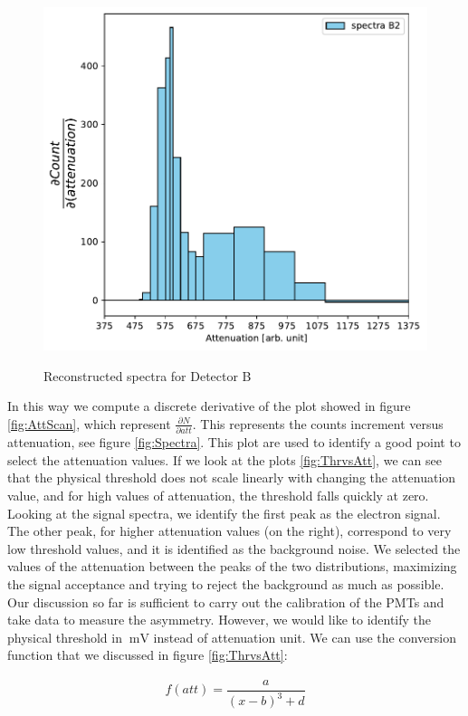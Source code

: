 \begin{figure}[!hbtp]
{\includegraphics[scale = 0.4]{Analysis/CalibrationPMT/B2.pdf}}
\caption{Reconstructed spectra for Detector B}
\end{figure}

In this way we compute a discrete derivative of the plot showed in figure \ref{fig:AttScan}, which represent $\frac{\partial N}{\partial att}$. This represents the counts increment versus attenuation, see figure \ref{fig:Spectra}.
This plot are used to identify a good point to select the attenuation values. If we look at the plots \ref{fig:ThrvsAtt}, we can see that the physical threshold does not scale linearly with changing the attenuation value, and for high values of attenuation, the threshold falls quickly at zero. 
Looking at the signal spectra, we identify the first peak as the electron signal. The other peak, for higher attenuation values (on the right), correspond to very low threshold values, and it is identified as the background noise. 
We selected the values of the attenuation between the peaks of the two distributions, maximizing the signal acceptance and trying to reject the background as much as possible.
Our discussion so far is sufficient to carry out the calibration of the PMTs and take data to measure the asymmetry. However, we would like to identify the physical threshold in $\SI{}{\milli \volt}$ instead of attenuation unit. We can use the conversion function that we discussed in figure \ref{fig:ThrvsAtt}:

\begin{align*}
f(att) = \dfrac{a}{(x - b)^{3} + d}
\end{align*} 

